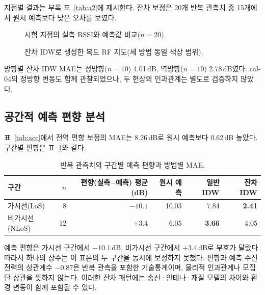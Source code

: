 \documentclass[11pt,a4paper]{article}
\newcommand{\figplaceholder}[2][0.86\textwidth]{%
  \fbox{\begin{minipage}[c][#2][c]{#1}\centering\small\color{gray}
  [그림 삽입 예정]\end{minipage}}}
\begin{document}
지점별 결과는 부록 표~\ref{tab:a2}에 제시한다. 잔차 보정은 20개 반복 관측치 중 15개에서 원시 예측보다
낮은 오차를 보였다.

\begin{figure}[htbp]
  \centering
  \figplaceholder{4.2cm}
  \caption{시험 지점의 실측 RSSI와 예측값 비교($n=20$).}
  \label{fig:pred}
\end{figure}

\begin{figure}[htbp]
  \centering
  \figplaceholder{4.2cm}
  \caption{잔차 IDW로 생성한 복도 RF 지도(세 방법 동일 색상 범위).}
  \label{fig:rfmap}
\end{figure}

방향별 잔차 IDW MAE는 정방향($n=10$) 4.01\,dB, 역방향($n=10$) 2.78\,dB였다. cal-04의 정방향
변동도 함께 관찰되었으나, 두 현상의 인과관계는 별도로 검증하지 않았다.

\subsection{공간적 예측 편향 분석}

표~\ref{tab:acc}에서 전역 편향 보정의 MAE는 8.26\,dB로 원시 예측보다 0.62\,dB 높았다. 구간별 편향은
표~\ref{tab:bias}와 같다.

\begin{table}[htbp]
  \centering\small
  \caption{반복 관측치의 구간별 예측 편향과 방법별 MAE.}
  \label{tab:bias}
  \begin{tabular}{@{}lrrrrr@{}}
    \toprule
    구간 & $n$ & 편향(실측$-$예측) 평균 (dB) & 원시 예측 & 일반 IDW & 잔차 IDW \\
    \midrule
    가시선(LoS)   & 8  & $\mathbf{-10.1}$ & 10.03 & 7.84 & \textbf{2.41} \\
    비가시선(NLoS) & 12 & $\mathbf{+3.4}$  & 6.05  & \textbf{3.66} & 4.05 \\
    \bottomrule
  \end{tabular}
\end{table}

예측 편향은 가시선 구간에서 $-10.1$\,dB, 비가시선 구간에서 $+3.4$\,dB로 부호가 달랐다. 따라서 하나의
상수는 이 표본의 두 구간을 동시에 보정하지 못했다. 편향과 예측 수신 전력의 상관계수 $-0.87$은 반복
관측을 포함한 기술통계이며, 물리적 인과관계나 모집단 상관을 뜻하지 않는다. 이러한 잔차 패턴에는
송신·안테나·재질 모델의 차이와 환경 변동이 함께 포함될 수 있다.
\end{document}
